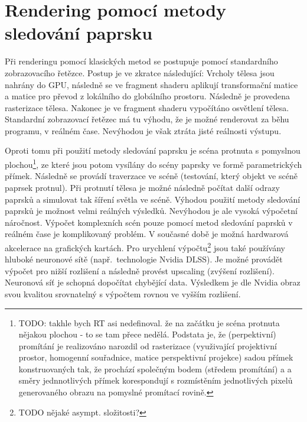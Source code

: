 \documentclass[czech,master]{diploma}
\begin{document}
\section{Rendering pomocí metody sledování paprsku}
Při renderingu pomocí klasických metod se postupuje pomocí standardního zobrazovacího řetězce. Postup je ve zkratce následující: Vrcholy tělesa jsou nahrány do GPU, následně se ve fragment shaderu aplikují transformační matice a matice pro převod z lokálního do globálního prostoru. Následně je provedena rasterizace tělesa. Nakonec je ve fragment shaderu vypočítáno osvětlení tělesa. Standardní zobrazovací řetězec má tu výhodu, že je možné renderovat za běhu programu, v reálném čase. Nevýhodou je však ztráta jisté reálnosti výstupu.\par
Oproti tomu při použití metody sledování paprsku je scéna protnuta s pomyslnou plochou\footnote{TODO: takhle bych RT asi nedefinoval. že na začátku je scéna protnuta nějakou plochou - to se tam přece nedělá.
  Podstata je, že (perpektivní) promítání je realizováno narozdil od rasterizace (využivající projektivní prostor, homogenní souřadnice, matice perspektivní projekce) sadou přímek konstruovaných tak, že prochází společným bodem (středem promítání) a a směry jednnotlivých přímek korespondují s rozmístěním jednotlivých pixelů generovaného obrazu na pomyslné promítací rovině.}, ze které jsou potom vysílány do scény paprsky ve formě parametrických přímek. Následně se provádí traverzace ve scéně (testování, který objekt ve scéně paprsek protnul). Při protnutí tělesa je možné následně počítat další odrazy paprsků a simulovat tak šíření světla ve scéně. Výhodou použití metody sledování paprsků je možnost velmi reálných výsledků. Nevýhodou je ale vysoká výpočetní náročnost. Výpočet komplexních scén pouze pomocí metod sledování paprsků v reálném čase je komplikovaný problém. V současné době je možná hardwarová akcelerace na grafických kartách. Pro urychlení výpočtu\footnote{TODO nějaké asympt. složitosti?} jsou také používány hluboké neuronové sítě (např.\ technologie Nvidia DLSS). Je možné provádět výpočet pro nižší rozlišení a následně provést upscaling (zvýšení rozlišení). Neuronová síť je schopná dopočítat chybějící data. Výsledkem je dle Nvidia obraz svou kvalitou srovnatelný s výpočtem rovnou ve vyšším rozlišení.
\end{document}

